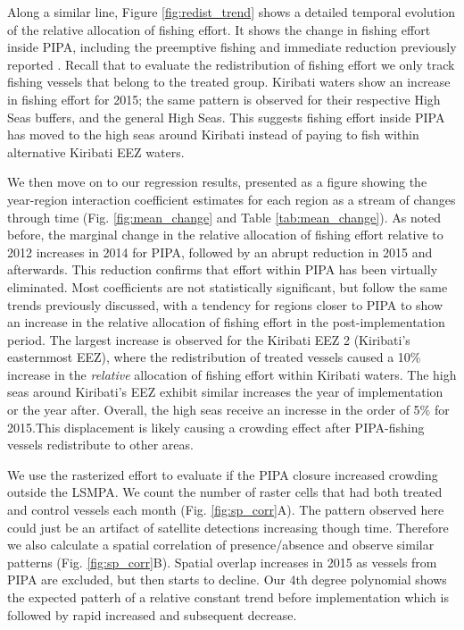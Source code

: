 \documentclass[9p,twocolumn,twoside,lineno]{pnas-new}
\begin{document}
Along a similar line, Figure \ref{fig:redist_trend} shows a detailed
temporal evolution of the relative allocation of fishing
effort.  It shows the change in fishing effort inside PIPA, including the
preemptive fishing and immediate reduction previously reported
\citep{mcdermott_2018}. Recall that to evaluate the redistribution of fishing effort
we only track fishing vessels that belong to the treated group.
Kiribati waters show an increase in fishing effort for 2015;
the same pattern is observed for their respective High Seas buffers,
and the general High Seas. This suggests fishing effort inside PIPA has moved to the
high seas around Kiribati instead of paying to fish within alternative Kiribati EEZ waters.

We then move on to our regression results, presented as a figure showing
the year-region interaction coefficient estimates for each region as a
stream of changes through time (Fig. \ref{fig:mean_change} and Table
\ref{tab:mean_change}). As noted before, the marginal change in the
relative allocation of fishing effort relative to 2012 increases in 2014
for PIPA, followed by an abrupt reduction in 2015 and afterwards. This 
reduction confirms that effort within PIPA has been virtually eliminated.
Most coefficients are not statistically significant, but
follow the same trends previously discussed, with a tendency for regions
closer to PIPA to show an increase in the relative allocation of fishing
effort in the post-implementation period. The largest increase is
observed for the Kiribati EEZ 2 (Kiribati's easternmost EEZ), where the
redistribution of treated vessels caused a 10\% increase in the \emph{relative} allocation of
fishing effort within Kiribati waters. The high seas around Kiribati's EEZ exhibit
similar increases the year of implementation or the year after. Overall, the high seas
receive an incresse in the order of 5\% for 2015.This displacement is likely
causing a crowding effect after PIPA-fishing vessels redistribute to
other areas.

We use the rasterized effort to evaluate if the PIPA closure increased
crowding outside the LSMPA. We count the number of raster cells that
had both treated and control vessels each month (Fig.
\ref{fig:sp_corr}A). The pattern observed here could just be an artifact
of satellite detections increasing though time. Therefore we also
calculate a spatial correlation of presence/absence and observe similar
patterns (Fig. \ref{fig:sp_corr}B). Spatial overlap increases
in 2015 as vessels from PIPA are excluded, but then starts to decline.
Our 4th degree polynomial shows the expected patterh of a relative
constant trend before implementation which is followed by rapid increased
and subsequent decrease.
\end{document}
